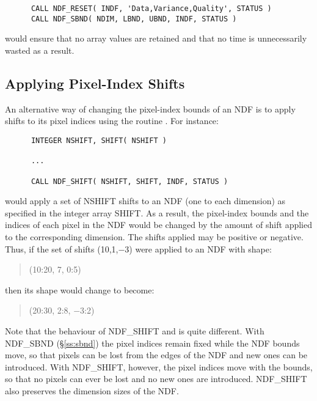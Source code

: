\small
\begin{verbatim}
      CALL NDF_RESET( INDF, 'Data,Variance,Quality', STATUS )
      CALL NDF_SBND( NDIM, LBND, UBND, INDF, STATUS )
\end{verbatim}
\normalsize

would ensure that no array values are retained and that no time is
unnecessarily wasted as a result.

\subsection{\label{ss:shift}Applying Pixel-Index Shifts}

An alternative way of changing the pixel-index bounds of an NDF is to apply
shifts to its pixel indices using the routine . 
For instance:

\small
\begin{verbatim}
      INTEGER NSHIFT, SHIFT( NSHIFT )

      ...

      CALL NDF_SHIFT( NSHIFT, SHIFT, INDF, STATUS )
\end{verbatim}
\normalsize

would apply a set of NSHIFT shifts to an NDF (one to each dimension) as
specified in the integer array SHIFT. 
As a result, the pixel-index bounds and the indices of each pixel in the NDF
would be changed by the amount of shift applied to the corresponding
dimension. 
The shifts applied may be positive or negative. 
Thus, if the set of shifts (10,1,$-$3) were applied to an NDF with shape:

\small
\begin{quote}
\begin{center}
(10:20, 7, 0:5)
\end{center}
\end{quote}
\normalsize

then its shape would change to become:

\small
\begin{quote}
\begin{center}
(20:30, 2:8, $-$3:2)
\end{center}
\end{quote}
\normalsize

Note that the behaviour of NDF\_SHIFT and  is quite different.
With NDF\_SBND (\S\ref{ss:sbnd}) the pixel indices remain fixed while the NDF
bounds move, so that pixels can be lost from the edges of the NDF and new
ones can be introduced. 
With NDF\_SHIFT, however, the pixel indices move with the bounds, so that 
no pixels can ever be lost and no new ones are introduced.
NDF\_SHIFT also preserves the dimension sizes of the NDF.

